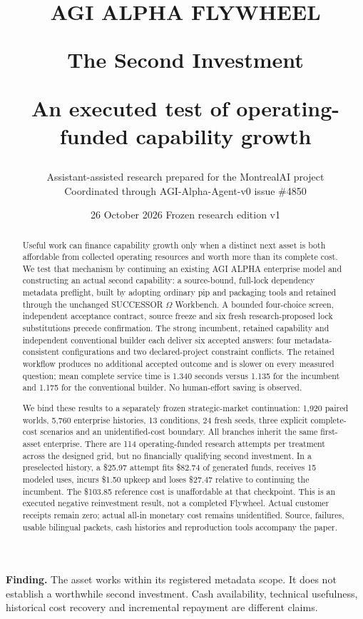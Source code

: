 \documentclass[11pt,letterpaper]{article}
\title{\vspace{-20pt}\color{AlphaPurple}\Large\textbf{AGI ALPHA FLYWHEEL}\par\vspace{8pt}\color{AlphaNavy}\Huge\textbf{The Second Investment}\par\vspace{10pt}\large An executed test of operating-funded capability growth}
\author{Assistant-assisted research prepared for the MontrealAI project\\\small Coordinated through AGI-Alpha-Agent-v0 issue \#4850}
\date{26 October 2026 \quad\textbullet\quad Frozen research edition v1}
\newcommand{\USD}[1]{\$#1}
\newcommand{\resultbox}[1]{\begin{center}\colorbox{AlphaMist}{\parbox{0.94\linewidth}{\vspace{5pt}#1\vspace{5pt}}}\end{center}}
\begin{document}
\maketitle
\thispagestyle{empty}
\begin{abstract}
\noindent Useful work can finance capability growth only when a distinct next asset is both affordable from collected operating resources and worth more than its complete cost. We test that mechanism by continuing an existing AGI ALPHA enterprise model and constructing an actual second capability: a source-bound, full-lock dependency metadata preflight, built by adopting ordinary pip and packaging tools and retained through the unchanged SUCCESSOR $\Omega$ Workbench. A bounded four-choice screen, independent acceptance contract, source freeze and six fresh research-proposed lock substitutions precede confirmation. The strong incumbent, retained capability and independent conventional builder each deliver six accepted answers: four metadata-consistent configurations and two declared-project constraint conflicts. The retained workflow produces no additional accepted outcome and is slower on every measured question; mean complete service time is 1.340 seconds versus 1.135 for the incumbent and 1.175 for the conventional builder. No human-effort saving is observed.

We bind these results to a separately frozen strategic-market continuation: 1,920 paired worlds, 5,760 enterprise histories, 13 conditions, 24 fresh seeds, three explicit complete-cost scenarios and an unidentified-cost boundary. All branches inherit the same first-asset enterprise. There are 114 operating-funded research attempts per treatment across the designed grid, but no financially qualifying second investment. In a preselected history, a \USD{25.97} attempt fits \USD{82.74} of generated funds, receives 15 modeled uses, incurs \USD{1.50} upkeep and loses \USD{27.47} relative to continuing the incumbent. The \USD{103.85} reference cost is unaffordable at that checkpoint. This is an executed negative reinvestment result, not a completed Flywheel. Actual customer receipts remain zero; actual all-in monetary cost remains unidentified. Source, failures, usable bilingual packets, cash histories and reproduction tools accompany the paper.
\end{abstract}

\resultbox{\textbf{Finding.} The asset works within its registered metadata scope. It does not establish a worthwhile second investment. Cash availability, technical usefulness, historical cost recovery and incremental repayment are different claims.}
\end{document}
